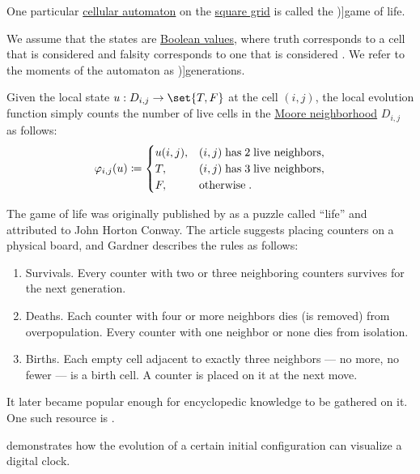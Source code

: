 \begin{definition}\label{def:game_of_life}\mimprovised
  One particular \hyperref[def:cellular_automaton]{cellular automaton} on the \hyperref[rem:automata_on_square_grid]{square grid} is called the \term[en=Game of Life (\cite[3]{HadelerMüller2017CellularAutomata})]{game of life}.

  We assume that the states are \hyperref[con:boolean_value]{Boolean values}, where truth corresponds to a cell that is considered  and falsity corresponds to one that is considered . We refer to the moments of the automaton as \term[en=generation (\cite[120]{Gardner1970GameOfLife})]{generations}.

  Given the local state \( u: D_{i, j} \to \set{ T, F } \) at the cell \( (i, j) \), the local evolution function simply counts the number of  live cells in the \hyperref[def:cayley_graph_neighborhood/moore]{Moore neighborhood} \( D_{i, j} \) as follows:
  \begin{equation}\label{eq:def:game_of_life}
    \varphi_{i,j}(u) \coloneqq \begin{cases}
      u(i, j), &(i, j) \T{has} 2 \T{live neighbors}, \\
      T,       &(i, j) \T{has} 3 \T{live neighbors}, \\
      F,       &\T{otherwise}.
    \end{cases}
  \end{equation}
\end{definition}
\begin{comments}
  \item The game of life was originally published by  as a puzzle called \enquote{life} and attributed to John Horton Conway. The article suggests placing counters on a physical board, and Gardner describes the rules as follows:
  \begin{displayquote}
    \begin{enumerate}
      \item Survivals. Every counter with two or three neighboring counters survives for the next generation.
      \item Deaths. Each counter with four or more neighbors dies (is removed) from overpopulation. Every counter with one neighbor or none dies from isolation.
      \item Births. Each empty cell adjacent to exactly three neighbors --- no more, no fewer --- is a birth cell. A counter is placed on it at the next move.
    \end{enumerate}
  \end{displayquote}

  It later became popular enough for encyclopedic knowledge to be gathered on it. One such resource is \cite{ConwayLife:home}.

  \cite{CGSE:game_of_life_digital_clock} demonstrates how the evolution of a certain initial configuration can visualize a digital clock.
\end{comments}

